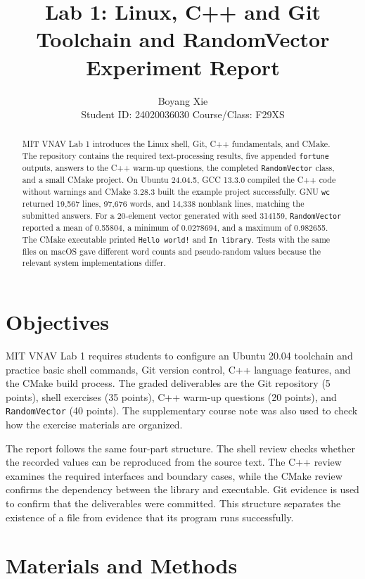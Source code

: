 \documentclass[letterpaper,10pt,conference]{ieeeconf}
\title{\LARGE \bf
Lab 1: Linux, C++ and Git\\
Toolchain and RandomVector Experiment Report}
\author{Boyang Xie\\
\small Student ID: 24020036030 \quad Course/Class: F29XS}
\begin{document}
\maketitle
\thispagestyle{empty}
\pagestyle{empty}

\begin{abstract}
MIT VNAV Lab 1 introduces the Linux shell, Git, C++ fundamentals, and CMake. The repository contains the required text-processing results, five appended \texttt{fortune} outputs, answers to the C++ warm-up questions, the completed \texttt{RandomVector} class, and a small CMake project. On Ubuntu 24.04.5, GCC 13.3.0 compiled the C++ code without warnings and CMake 3.28.3 built the example project successfully. GNU \texttt{wc} returned 19,567 lines, 97,676 words, and 14,338 nonblank lines, matching the submitted answers. For a 20-element vector generated with seed 314159, \texttt{RandomVector} reported a mean of 0.55804, a minimum of 0.0278694, and a maximum of 0.982655. The CMake executable printed \texttt{Hello world!} and \texttt{In library}. Tests with the same files on macOS gave different word counts and pseudo-random values because the relevant system implementations differ.
\end{abstract}

\section{Objectives}

MIT VNAV Lab 1 requires students to configure an Ubuntu 20.04 toolchain and practice basic shell commands, Git version control, C++ language features, and the CMake build process\cite{vnavlab1,vnavcmake}. The graded deliverables are the Git repository (5 points), shell exercises (35 points), C++ warm-up questions (20 points), and \texttt{RandomVector} (40 points)\cite{vnavexercises}. The supplementary course note was also used to check how the exercise materials are organized\cite{labbrief}.

The report follows the same four-part structure. The shell review checks whether the recorded values can be reproduced from the source text. The C++ review examines the required interfaces and boundary cases, while the CMake review confirms the dependency between the library and executable. Git evidence is used to confirm that the deliverables were committed. This structure separates the existence of a file from evidence that its program runs successfully.

\section{Materials and Methods}
\end{document}

